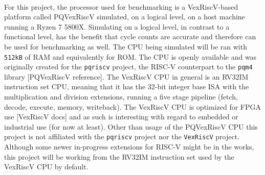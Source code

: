 \medskip\\
For this project, the processor used for benchmarking is a VexRiscV-based platform called PQVexRiscV simulated, on a logical level, on a host machine running a Ryzen 7 5800X. Simulating on a logical level, in contrast to a functional level, has the benefit that cycle counts are accurate and therefore can be used for benchmarking as well. The CPU being simulated will be ran with \texttt{512kB} of RAM and equivalently for ROM. The CPU is openly available and was originally created for the \texttt{pqriscv} project, the RISC-V counterpart to the \texttt{pqm4} library [PQVexRiscV reference]. The VexRiscV CPU in general is an RV32IM instruction set CPU, meaning that it has the 32-bit integer base ISA with the multiplication and division extensions, running a five stage pipeline (fetch, decode, execute, memory, writeback). The VexRiscV CPU is optimized for FPGA use [VexRiscV docs] and as such is interesting with regard to embedded or industrial use (for now at least). Other than usage of the PQVexRiscV CPU this project is not affiliated with the \texttt{pqriscv} project nor the \texttt{VexRiscV} project. Although some newer in-progress extensions for RISC-V might be in the works, this project will be working from the RV32IM instruction set used by the VexRiscV CPU by default.\medskip\\